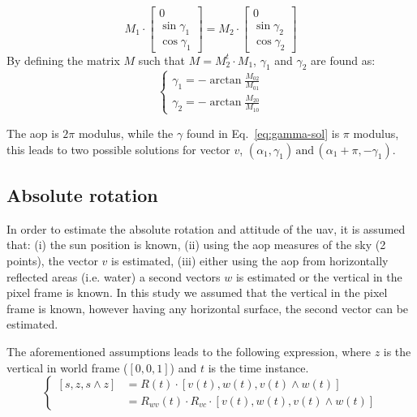 \begin{equation}
  M_{1}\cdot
  \begin{bmatrix}
0\\
\sin\gamma_{1}\\
\cos\gamma_{1}
\end{bmatrix}
=M_{2}\cdot
\begin{bmatrix}
0\\
\sin\gamma_{2}\\
\cos\gamma_{2}
\end{bmatrix}
\label{eq:2pts}
\end{equation}
\noindent By defining the matrix $M$ such
that $M=M_{2}^{t}\cdot M_{1}$, $\gamma_1$ and $\gamma_2$ are found as:
\begin{equation}
\begin{cases}
\gamma_{1}=-\arctan\frac{M_{02}}{M_{01}}\\
\gamma_{2}=-\arctan\frac{M_{20}}{M_{10}}
\end{cases}\label{eq:gamma-sol}
\end{equation}

The \gls{aop} is $2\pi$ modulus, while the $\gamma$ found in
Eq.~\ref{eq:gamma-sol} is $\pi$ modulus, this leads to two possible solutions
for vector $v$,
$\left(\alpha_{1},\gamma_{1}\right)\,\text{and}\,\left(\alpha_{1}+\pi,-\gamma_{1}\right)$.

\subsection{Absolute rotation}
\label{sec:abs-rot}
In order to estimate the absolute rotation and attitude of the \gls{uav}, it is
assumed that: (i) the sun position is known, (ii) using the \gls{aop} measures
of the sky (2 points), the vector $v$ is estimated, (iii) either using the \gls{aop}
from horizontally reflected areas (i.e. water) a second vectors $w$ is
estimated or the vertical in the pixel frame is known.
In this study we assumed that the vertical in the pixel frame is known, however
having any horizontal surface, the second vector can be estimated.

The aforementioned assumptions leads to the following expression, where $z$ is
the vertical in world frame ($[0, 0, 1]$) and $t$ is the time instance.
\begin{equation}
\begin{cases}
\left[s,z,s\wedge z\right] & =R(t)\cdot\left[v(t),w(t),v(t)\wedge w(t)\right]\\
 & =R_{wv}(t)\cdot R_{vc}\cdot\left[v(t),w(t),v(t)\wedge w(t)\right]
\end{cases}
\label{eq:linear_equation}
\end{equation}

